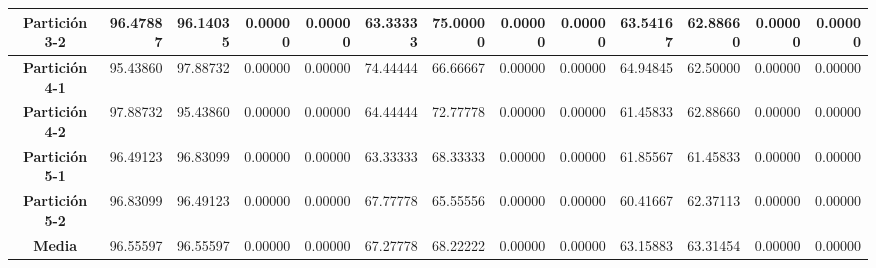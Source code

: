 \documentclass[a4paper,11pt]{article}
\begin{document}
\begin{table}[H]
\begin{adjustbox}{width=1.1\textwidth}
\begin{tabular}{|c|r|r|r|r|r|r|r|r|r|r|r|r|}
    \textbf{Partición 3-2} & 96.47887 & 96.14035 & 0.00000 & 0.00000 & 63.33333 & 75.00000 & 0.00000 & 0.00000 & 63.54167 & 62.88660 & 0.00000 & 0.00000 \\ \hline
    \textbf{Partición 4-1} & 95.43860 & 97.88732 & 0.00000 & 0.00000 & 74.44444 & 66.66667 & 0.00000 & 0.00000 & 64.94845 & 62.50000 & 0.00000 & 0.00000 \\ \hline
    \textbf{Partición 4-2} & 97.88732 & 95.43860 & 0.00000 & 0.00000 & 64.44444 & 72.77778 & 0.00000 & 0.00000 & 61.45833 & 62.88660 & 0.00000 & 0.00000 \\ \hline
    \textbf{Partición 5-1} & 96.49123 & 96.83099 & 0.00000 & 0.00000 & 63.33333 & 68.33333 & 0.00000 & 0.00000 & 61.85567 & 61.45833 & 0.00000 & 0.00000 \\ \hline
    \textbf{Partición 5-2} & 96.83099 & 96.49123 & 0.00000 & 0.00000 & 67.77778 & 65.55556 & 0.00000 & 0.00000 & 60.41667 & 62.37113 & 0.00000 & 0.00000 \\ \hline
    \textbf{Media} & 96.55597 & 96.55597 & 0.00000 & 0.00000 & 67.27778 & 68.22222 & 0.00000 & 0.00000 & 63.15883 & 63.31454 & 0.00000 & 0.00000 \\ \hline
    \end{tabular}
    \end{adjustbox}
    \label{NN3}
  \end{table}
  
\end{document}
